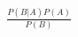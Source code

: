 \documentclass[preview]{standalone}
\begin{document}
\begin{align*}
\frac{P(B|A)P(A)}{P(B)}
\end{align*}
\end{document}
